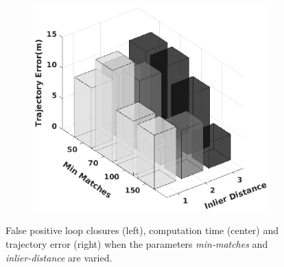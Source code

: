 \begin{figure}
\begin{subfigure}[b]{0.3\textwidth}
	\end{subfigure}
	\begin{subfigure}[b]{0.3\textwidth}
		\includegraphics[width=\textwidth]{Figure6_c.eps}
	\end{subfigure}
\caption{False positive loop closures (left), computation time (center) and trajectory error (right) when the parameters {\it min-matches} and {\it inlier-distance} are varied. }
\label{RGBD_analysis}
\end{figure}



